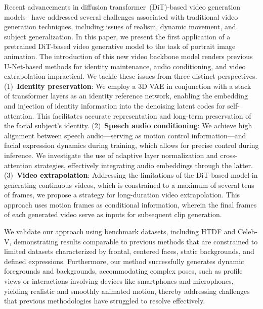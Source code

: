 Recent advancements in diffusion transformer~(DiT)-based video generation models~\cite{yang2024cogvideox, polyak2024movie, bao2024vidu, liu2024sora} have addressed several challenges associated with traditional video generation techniques, including issues of realism, dynamic movement, and subject generalization. 
In this paper, we present the first application of a pretrained DiT-based video generative model to the task of portrait image animation.
The introduction of this new video backbone model renders previous U-Net-based methods for identity maintenance, audio conditioning, and video extrapolation impractical. 
We tackle these issues from three distinct perspectives.
(1)~\textbf{Identity preservation}: We employ a 3D VAE in conjunction with a stack of transformer layers as an identity reference network, enabling the embedding and injection of identity information into the denoising latent codes for self-attention. This facilitates accurate representation and long-term preservation of the facial subject's identity.
(2)~\textbf{Speech audio conditioning}: We achieve high alignment between speech audio—serving as motion control information—and facial expression dynamics during training, which allows for precise control during inference. We investigate the use of adaptive layer normalization and cross-attention strategies, effectively integrating audio embeddings through the latter.
(3)~\textbf{Video extrapolation}: Addressing the limitations of the DiT-based model in generating continuous videos, which is constrained to a maximum of several tens of frames, we propose a strategy for long-duration video extrapolation. 
This approach uses motion frames as conditional information, wherein the final frames of each generated video serve as inputs for subsequent clip generation.

We validate our approach using benchmark datasets, including HTDF and Celeb-V, demonstrating results comparable to previous methods that are constrained to limited datasets characterized by frontal, centered faces, static backgrounds, and defined expressions. 
Furthermore, our method successfully generates dynamic foregrounds and backgrounds, accommodating complex poses, such as profile views or interactions involving devices like smartphones and microphones, yielding realistic and smoothly animated motion, thereby addressing challenges that previous methodologies have struggled to resolve effectively. 